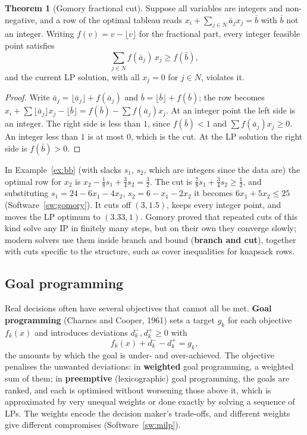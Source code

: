 \documentclass[11pt,a4paper]{article}
\numberwithin{equation}{section}
\theoremstyle{definition}
\newtheorem{thm}{Theorem}[subsection]
\begin{document}
\begin{thm}[Gomory fractional cut]
\label{thm:gomory}
Suppose all variables are integers and non-negative, and a row of the optimal tableau reads $x_i + \sum_{j \in N}\bar a_jx_j = \bar b$ with $\bar b$ not an integer. Writing $f(v) = v - \lfloor v\rfloor$ for the fractional part, every integer feasible point satisfies
\[
\sum_{j \in N}f(\bar a_j)\,x_j \geq f(\bar b) ,
\]
and the current LP solution, with all $x_j = 0$ for $j \in N$, violates it.
\end{thm}

\begin{proof}
Write $\bar a_j = \lfloor\bar a_j\rfloor + f(\bar a_j)$ and $\bar b = \lfloor\bar b\rfloor + f(\bar b)$; the row becomes $x_i + \sum\lfloor\bar a_j\rfloor x_j - \lfloor\bar b\rfloor = f(\bar b) - \sum f(\bar a_j)x_j$. At an integer point the left side is an integer. The right side is less than $1$, since $f(\bar b) < 1$ and $\sum f(\bar a_j)x_j \geq 0$.
An integer less than $1$ is at most $0$, which is the cut. At the LP solution the right side is $f(\bar b) > 0$.
\end{proof}

In Example~\ref{ex:bb} (with slacks $s_1$, $s_2$, which are integers since the data are) the optimal row for $x_2$ is $x_2 - \frac18s_1 + \frac34s_2 = \frac32$. The cut is $\frac78s_1 + \frac34s_2 \geq \frac12$, and substituting $s_1 = 24 - 6x_1 - 4x_2$, $s_2 = 6 - x_1 - 2x_2$ it becomes
$6x_1 + 5x_2 \leq 25$ (Software~\ref{sw:gomory}). It cuts off $(3, 1.5)$, keeps every integer point, and moves the LP optimum to $(3.33, 1)$. Gomory proved that repeated cuts of this kind solve any IP in finitely many steps, but on their own they converge slowly; modern solvers use them inside branch and bound
(\textbf{branch and cut}), together with cuts specific to the structure, such as cover inequalities for knapsack rows.

\subsection{Goal programming}
\label{ssec:goal}

Real decisions often have several objectives that cannot all be met. \textbf{Goal programming} (Charnes and Cooper, 1961) sets a target $g_k$ for each objective $f_k(x)$ and introduces deviations $d_k^-, d_k^+ \geq 0$ with
\[
f_k(x) + d_k^- - d_k^+ = g_k ,
\]
the amounts by which the goal is under- and over-achieved. The objective penalises the unwanted deviations: in \textbf{weighted} goal programming, a weighted sum of them; in \textbf{preemptive} (lexicographic) goal programming, the goals are ranked, and each is optimised without worsening those above it, which is approximated by very unequal weights or done exactly by
solving a sequence of LPs. The weights encode the decision maker's trade-offs, and different weights give different compromises (Software~\ref{sw:milp}).
\end{document}
